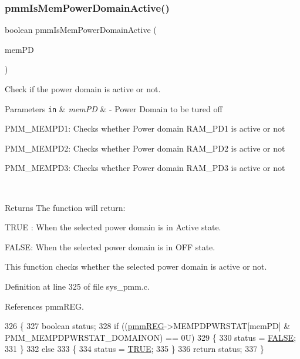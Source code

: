\subsubsection{\texorpdfstring{pmm\+Is\+Mem\+Power\+Domain\+Active()}{pmmIsMemPowerDomainActive()}}
{\footnotesize\ttfamily boolean pmm\+Is\+Mem\+Power\+Domain\+Active (\begin{DoxyParamCaption}\item[{pmm\+\_\+\+Mem\+P\+D\+\_\+t}]{mem\+PD }\end{DoxyParamCaption})}



Check if the power domain is active or not. 


\begin{DoxyParams}[1]{Parameters}
\mbox{\tt in}  & {\em mem\+PD} & -\/ Power Domain to be tured off
\begin{DoxyItemize}
\item P\+M\+M\+\_\+\+M\+E\+M\+P\+D1\+: Checks whether Power domain R\+A\+M\+\_\+\+P\+D1 is active or not
\item P\+M\+M\+\_\+\+M\+E\+M\+P\+D2\+: Checks whether Power domain R\+A\+M\+\_\+\+P\+D2 is active or not
\item P\+M\+M\+\_\+\+M\+E\+M\+P\+D3\+: Checks whether Power domain R\+A\+M\+\_\+\+P\+D3 is active or not 
\end{DoxyItemize}\\
\hline
\end{DoxyParams}
\begin{DoxyReturn}{Returns}
The function will return\+:
\begin{DoxyItemize}
\item T\+R\+UE \+: When the selected power domain is in Active state.
\item F\+A\+L\+SE\+: When the selected power domain is in O\+FF state.
\end{DoxyItemize}
\end{DoxyReturn}
This function checks whether the selected power domain is active or not. 

Definition at line 325 of file sys\+\_\+pmm.\+c.



References pmm\+R\+EG.


\begin{DoxyCode}
326 \{
327     \textcolor{keywordtype}{boolean} status;
328     \textcolor{keywordflow}{if} ((\mbox{\hyperlink{reg__pmm_8h_a57b193bea1bf1951b97bdfee07f48598}{pmmREG}}->MEMPDPWRSTAT[memPD] & PMM\_MEMPDPWRSTAT\_DOMAINON) == 0U)
329     \{
330         status = \mbox{\hyperlink{hal__stdtypes_8h_aa93f0eb578d23995850d61f7d61c55c1}{FALSE}};
331     \}
332     \textcolor{keywordflow}{else}
333     \{
334         status = \mbox{\hyperlink{hal__stdtypes_8h_aa8cecfc5c5c054d2875c03e77b7be15d}{TRUE}};
335     \}
336     \textcolor{keywordflow}{return} status;
337 \}
\end{DoxyCode}
\mbox{\label{group__PMM_ga0a27f5db51b603a069b61e2fa149d81b}} 
